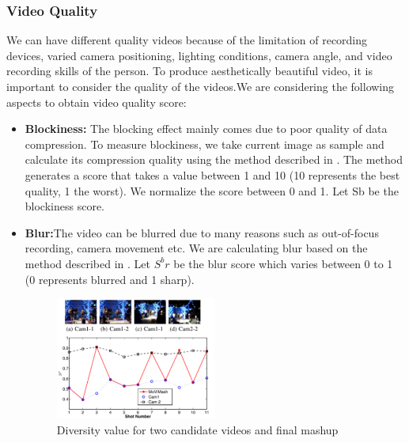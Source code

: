 \documentclass{sig-alternate}
\begin{document}
\subsubsection{Video Quality}
We can have different quality videos because of the limitation of recording devices, varied camera positioning, lighting conditions, camera angle, and video recording skills of the person. To produce aesthetically beautiful video, it is important to consider the quality of the videos.We are considering the following aspects to obtain video quality score:
\begin{itemize}
    \item \textbf{Blockiness:} The blocking effect mainly comes due to poor quality of data compression. To measure blockiness, we take current image as sample and calculate its compression quality using the method described in \cite{18}. The method generates a score that takes a value between 1 and 10 (10 represents the best quality, 1 the worst). We normalize the score between 0 and 1. Let Sb be the blockiness score.
    
    \item \textbf{Blur:}The video can be blurred due to many reasons such as out-of-focus recording, camera movement etc. We are calculating blur based on the method described in \cite{5}. Let $S^br$ be the blur score which varies between 0 to 1 (0 represents blurred and 1 sharp).
    
    \begin{figure}[h]
    \centering
    \includegraphics[width=0.5\textwidth]{img5.png}
    \caption{Diversity value for two candidate videos and final mashup}
    \label{fig:mesh5}
\end{figure}
    

\end{itemize}
\end{document}
